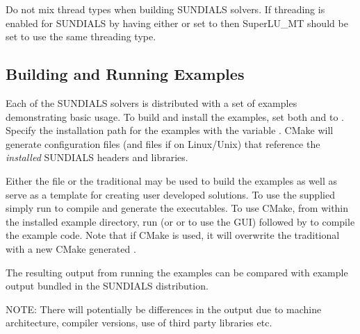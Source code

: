 \documentclass[letterpaper,10pt,english]{sphinxmanual}
\begin{document}
Do not mix thread types when building SUNDIALS solvers.
If threading is enabled for SUNDIALS by having either
 or  set to  then SuperLU\_MT
should be set to use the same threading type.


\subsection{Building and Running Examples}
\label{Install:building-and-running-examples}\label{Install:installation-cmake-buildrunexamples}
Each of the SUNDIALS solvers is distributed with a set of examples
demonstrating basic usage.  To build and install the examples, set
both  and  to . Specify
the installation path for the examples with the variable
. CMake will generate 
configuration files (and  files if on Linux/Unix) that
reference the \emph{installed} SUNDIALS headers and libraries.

Either the  file or the traditional  may
be used to build the examples as well as serve as a template for
creating user developed solutions.  To use the supplied 
simply run  to compile and generate the executables.  To use
CMake, from within the installed example directory, run  (or
 or  to use the GUI) followed by  to
compile the example code.  Note that if CMake is used, it will
overwrite the traditional  with a new CMake generated
.

The resulting output from running the examples can be compared with
example output bundled in the SUNDIALS distribution.

NOTE: There will potentially be differences in the output due to
machine architecture, compiler versions, use of third party libraries etc.
\end{document}

